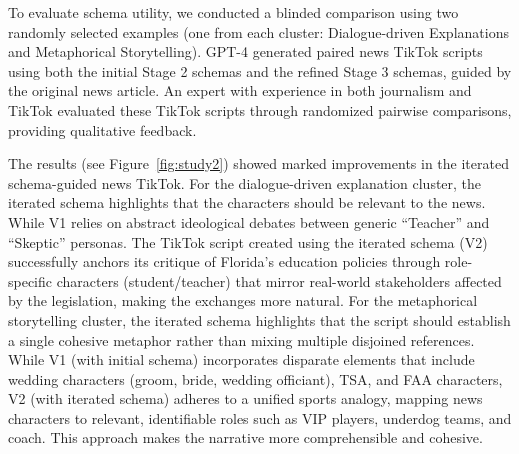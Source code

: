 To evaluate schema utility, we conducted a blinded comparison using two randomly selected examples (one from each cluster: Dialogue-driven Explanations and Metaphorical Storytelling). 
GPT-4 generated paired news TikTok scripts using both the initial Stage 2 schemas and the refined Stage 3 schemas, guided by the original news article. 
An expert with experience in both journalism and TikTok evaluated these TikTok scripts through randomized pairwise comparisons, providing qualitative feedback.

The results (see Figure~\ref{fig:study2}) showed marked improvements in the iterated schema-guided news TikTok.
For the dialogue-driven explanation cluster, the iterated schema highlights that the characters should be relevant to the news.
While V1 relies on abstract ideological debates between generic ``Teacher'' and ``Skeptic'' personas.
The TikTok script created using the iterated schema (V2) successfully anchors its critique of Florida’s education policies through role-specific characters (student/teacher) that mirror real-world stakeholders affected by the legislation, making the exchanges more natural. 
For the metaphorical storytelling cluster, the iterated schema highlights that the script should establish a single cohesive metaphor rather than mixing multiple disjoined references.
While V1 (with initial schema) incorporates disparate elements that include wedding characters (groom, bride, wedding officiant), TSA, and FAA characters, V2 (with iterated schema) adheres to a unified sports analogy, mapping news characters to relevant, identifiable roles such as VIP players, underdog teams, and coach.
This approach makes the narrative more comprehensible and cohesive.
